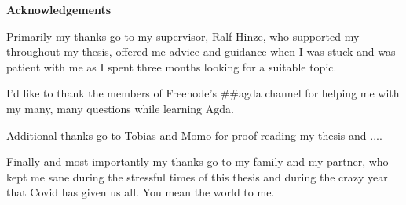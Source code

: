 \newpage
\thispagestyle{empty}
\hspace{0pt}
\vfill
\begin{center}
    \textbf{Acknowledgements}
\end{center}

\noindent Primarily my thanks go to my supervisor, Ralf Hinze, who supported my throughout my thesis, offered me advice and guidance when I was stuck and was patient with me as I spent three months looking for a suitable topic.

I'd like to thank the members of Freenode's \#\#agda channel for helping me with my many, many questions while learning Agda.

Additional thanks go to Tobias and Momo for proof reading my thesis and ....

Finally and most importantly my thanks go to my family and my partner, who kept me sane during the stressful times of this thesis and during the crazy year that Covid has given us all. You mean the world to me.

\vfill
\hspace{0pt}
